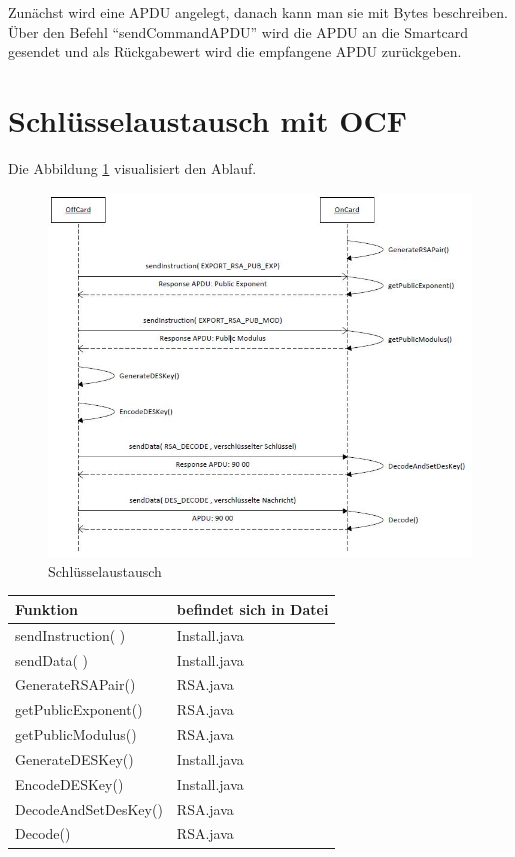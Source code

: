 \documentclass[parskip]{scrartcl}
\begin{document}
		Zunächst wird eine APDU angelegt, danach kann man sie mit Bytes beschreiben. Über den Befehl \enquote{sendCommandAPDU} wird die APDU an die Smartcard gesendet und als Rückgabewert wird die empfangene APDU zurückgeben.
		
	\section{Schlüsselaustausch mit OCF}
		Die Abbildung \ref{fig:KeyExchange} visualisiert den Ablauf.
		
		\begin{figure}[H]
			\includegraphics[width=\linewidth]{./KeyExchange}
			\caption{Schlüsselaustausch}
			\label{fig:KeyExchange}
		\end{figure}
	
		\begin{tabular}{|l|l|}
			\hline Funktion & befindet sich in Datei \\ 
			\hline
			\hline sendInstruction( ) & Install.java \\ 
			\hline sendData( ) & Install.java \\ 
			\hline GenerateRSAPair()  & RSA.java \\ 
			\hline getPublicExponent() & RSA.java \\ 
			\hline getPublicModulus() & RSA.java \\ 
			\hline GenerateDESKey() & Install.java \\ 
			\hline EncodeDESKey() & Install.java \\
			\hline DecodeAndSetDesKey() & RSA.java \\
			\hline Decode() & RSA.java \\
			\hline 
		\end{tabular} 
		
\end{document}
